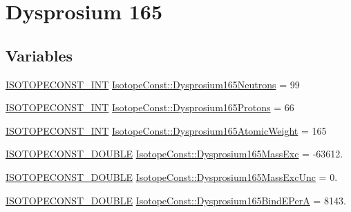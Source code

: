 \hypertarget{group___isotope_const-_dysprosium-_dy165}{}\section{Dysprosium 165}
\label{group___isotope_const-_dysprosium-_dy165}
\subsection*{Variables}
\begin{DoxyCompactItemize}
\item 
\mbox{\hyperlink{group___isotope_const-_macros_ga5f18360b3e99483a35c32d789e62621c}{I\+S\+O\+T\+O\+P\+E\+C\+O\+N\+S\+T\+\_\+\+I\+NT}} \mbox{\hyperlink{group___isotope_const-_dysprosium-_dy165_ga9212e32e962ef9e78d63535951c712ea}{Isotope\+Const\+::\+Dysprosium165\+Neutrons}} = 99
\item 
\mbox{\hyperlink{group___isotope_const-_macros_ga5f18360b3e99483a35c32d789e62621c}{I\+S\+O\+T\+O\+P\+E\+C\+O\+N\+S\+T\+\_\+\+I\+NT}} \mbox{\hyperlink{group___isotope_const-_dysprosium-_dy165_ga84667e832dd4b6df62d912de7c4767c0}{Isotope\+Const\+::\+Dysprosium165\+Protons}} = 66
\item 
\mbox{\hyperlink{group___isotope_const-_macros_ga5f18360b3e99483a35c32d789e62621c}{I\+S\+O\+T\+O\+P\+E\+C\+O\+N\+S\+T\+\_\+\+I\+NT}} \mbox{\hyperlink{group___isotope_const-_dysprosium-_dy165_gac6aa8d3dd90f3b25571a40b3e13487d6}{Isotope\+Const\+::\+Dysprosium165\+Atomic\+Weight}} = 165
\item 
\mbox{\hyperlink{group___isotope_const-_macros_ga8f45a7272ce02c0b4c65c44636ed719a}{I\+S\+O\+T\+O\+P\+E\+C\+O\+N\+S\+T\+\_\+\+D\+O\+U\+B\+LE}} \mbox{\hyperlink{group___isotope_const-_dysprosium-_dy165_ga959dca90a3dde0df308403a84a196e8e}{Isotope\+Const\+::\+Dysprosium165\+Mass\+Exc}} = -\/63612.
\item 
\mbox{\hyperlink{group___isotope_const-_macros_ga8f45a7272ce02c0b4c65c44636ed719a}{I\+S\+O\+T\+O\+P\+E\+C\+O\+N\+S\+T\+\_\+\+D\+O\+U\+B\+LE}} \mbox{\hyperlink{group___isotope_const-_dysprosium-_dy165_ga1abab731cee912ad931a7b4d8d7f4bf2}{Isotope\+Const\+::\+Dysprosium165\+Mass\+Exc\+Unc}} = 0.
\item 
\mbox{\hyperlink{group___isotope_const-_macros_ga8f45a7272ce02c0b4c65c44636ed719a}{I\+S\+O\+T\+O\+P\+E\+C\+O\+N\+S\+T\+\_\+\+D\+O\+U\+B\+LE}} \mbox{\hyperlink{group___isotope_const-_dysprosium-_dy165_ga6fc8bd7eed4aef67e23b8da89e7e47f6}{Isotope\+Const\+::\+Dysprosium165\+Bind\+E\+PerA}} = 8143.

\end{DoxyCompactItemize}
